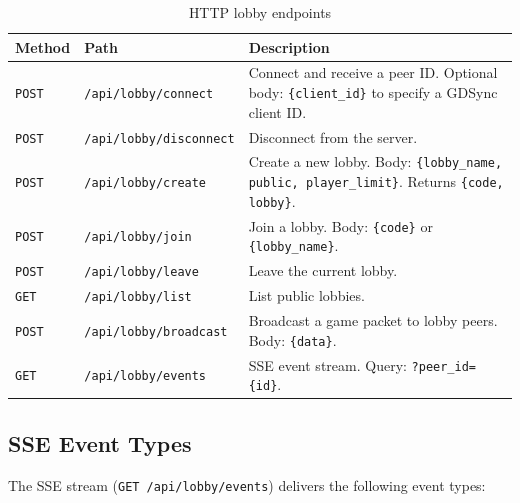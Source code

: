 \begin{table}[htbp]
    \centering
    \caption{HTTP lobby endpoints}
    \begin{tabular}{@{}llp{7cm}@{}}
        \toprule
        \textbf{Method} & \textbf{Path}                  & \textbf{Description}                                                                                         \\
        \midrule
        \texttt{POST}   & \texttt{/api/lobby/connect}    & Connect and receive a peer ID. Optional body: \texttt{\{client\_id\}} to specify a GDSync client ID.         \\
        \texttt{POST}   & \texttt{/api/lobby/disconnect} & Disconnect from the server.                                                                                  \\
        \texttt{POST}   & \texttt{/api/lobby/create}     & Create a new lobby. Body: \texttt{\{lobby\_name, public, player\_limit\}}. Returns \texttt{\{code, lobby\}}. \\
        \texttt{POST}   & \texttt{/api/lobby/join}       & Join a lobby. Body: \texttt{\{code\}} or \texttt{\{lobby\_name\}}.                                           \\
        \texttt{POST}   & \texttt{/api/lobby/leave}      & Leave the current lobby.                                                                                     \\
        \texttt{GET}    & \texttt{/api/lobby/list}       & List public lobbies.                                                                                         \\
        \texttt{POST}   & \texttt{/api/lobby/broadcast}  & Broadcast a game packet to lobby peers. Body: \texttt{\{data\}}.                                             \\
        \texttt{GET}    & \texttt{/api/lobby/events}     & SSE event stream. Query: \texttt{?peer\_id=\{id\}}.                                                          \\
        \bottomrule
    \end{tabular}
\end{table}

\subsection{SSE Event Types}
\label{app:c:sse-events}

The SSE stream (\texttt{GET /api/lobby/events}) delivers the following event types:

